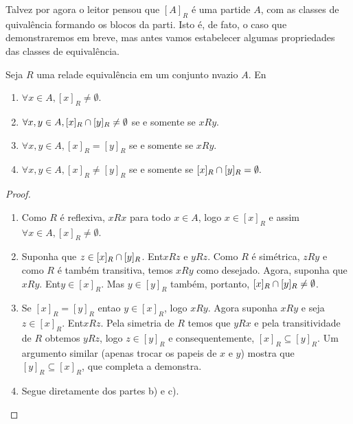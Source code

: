 Talvez por agora o leitor pensou que $[A]_R$ \'e uma parti\cao de $A$, com as classes de quival\^encia formando os blocos da parti\caoi. Isto \'e, de fato, o caso que demonstraremos em breve, mas antes vamos estabelecer algumas propriedades das classes de equival\^encia.
\begin{teob}\label{relteo1}
Seja $R$ uma rela\cao de equival\^encia em um conjunto n\ao vazio $A$. En\tao
\begin{enumerate}[{\bf a)}]
\item $\forall x\in A, [x]_R\neq\emptyset$.
\item $\forall x,y\in A, [x]_R\cap[y]_R\neq\emptyset$ se e somente se $xRy$.
\item $\forall x,y\in A,[x]_R=[y]_R$ se e somente se $xRy$.
\item $\forall x,y\in A, [x]_R\neq[y]_R$ se e somente se $[x]_R\cap[y]_R=\emptyset.$
\end{enumerate}
\end{teob}
\begin{proof}
 \begin{enumerate}[{\bf a)}]
\item Como $R$ \'e reflexiva, $xRx$ para todo $x\in A$, logo $x\in[x]_R$ e assim $\forall x\in A, [x]_R\neq\emptyset$.
\item Suponha que $z\in [x]_R\cap [y]_R$. Ent\ao $xRz$ e $yRz$. Como $R$ \'e sim\'etrica, $zRy$ e como $R$ \'e tamb\'em transitiva, temos $xRy$ como desejado. Agora, suponha que $xRy$. Ent\ao $y\in[x]_R$. Mas $y\in[y]_R$ tamb\'em, portanto, $[x]_R\cap[y]_R\neq\emptyset$. 
\item Se $[x]_R=[y]_R$ entao $y\in[x]_R$, logo $xRy$. Agora suponha $xRy$ e seja $z\in[x]_R$. Ent\ao $xRz$. Pela simetria de $R$ temos que $yRx$ e pela transitividade de $R$ obtemos $yRz$, logo $z\in[y]_R$ e consequentemente, $[x]_R\subseteq[y]_R$. Um argumento similar (apenas trocar os papeis de $x$ e $y$) mostra que $[y]_R\subseteq[x]_R$, que completa a demonstra\caoi.
\item Segue diretamente dos partes b) e c).
\end{enumerate}
\end{proof}
\\

